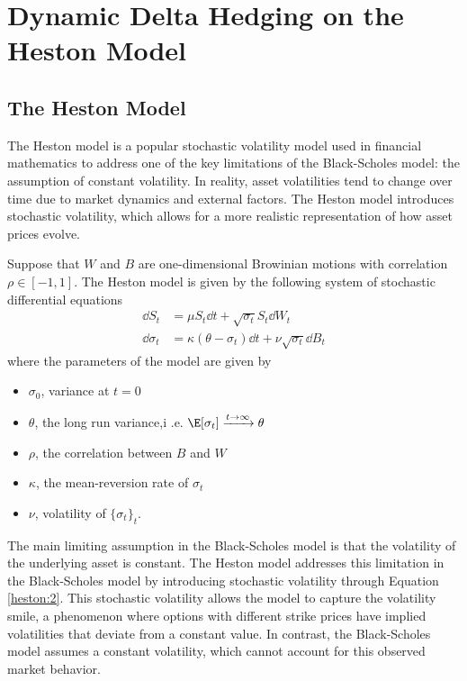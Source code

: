 \documentclass{article}
\begin{document}
\section{Dynamic Delta Hedging on the Heston Model}

\subsection{The Heston Model}
The Heston model is a popular stochastic volatility model used in financial mathematics to address one of the key limitations of the Black-Scholes model: the assumption of constant volatility. In reality, asset volatilities tend to change over time due to market dynamics and external factors. The Heston model introduces stochastic volatility, which allows for a more realistic representation of how asset prices evolve.


Suppose that $ W $ and $ B $ are one-dimensional Browinian motions with correlation $ \rho\in [-1,1] $. The Heston model is given by the following system of stochastic differential equations
\begin{align}
	\dd{S_{t}} &= \mu S_{t} \dd{t} + \sqrt{\sigma_{t}} S_{t} \dd{W_{t}} \label{heston:1} \\ 
	\dd{\sigma_{t}} &= \kappa (\theta - \sigma_{t})\dd{t}  + \nu \sqrt{\sigma_{t}} \dd{B_{t}} \label{heston:2}
\end{align}
where the parameters of the model are given by
\begin{itemize}
	\item $ \sigma_{0} $, variance at $ t=0 $
	\item $ \theta $, the long run variance,i .e. $ \E[\sigma_{t}] \xrightarrow{t\to\infty} \theta$
	\item $ \rho $, the correlation between $ B $ and $ W $
	\item $ \kappa $, the mean-reversion rate of $ \sigma_{t} $
	\item $ \nu $, volatility of $ \{\sigma_{t}\}_{t} $.
\end{itemize}

The main limiting assumption in the Black-Scholes model is that the volatility of the underlying asset is constant.  The Heston model addresses this limitation in the Black-Scholes model by introducing stochastic volatility through Equation \ref{heston:2}. This stochastic volatility allows the model to capture the volatility smile, a phenomenon where options with different strike prices have implied volatilities that deviate from a constant value. In contrast, the Black-Scholes model assumes a constant volatility, which cannot account for this observed market behavior.
\end{document}

